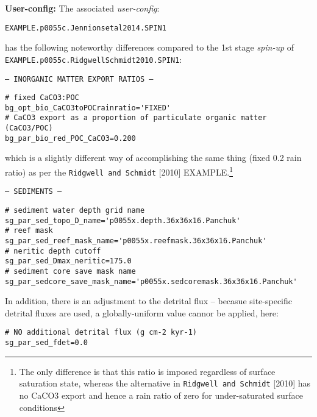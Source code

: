 \documentclass[10pt,twoside]{article}
\begin{document}
\noindent \textbf{User-config:} The associated \textit{user-config}:
\vspace{-10pt}\begin{verbatim}EXAMPLE.p0055c.Jennionsetal2014.SPIN1\end{verbatim}\vspace{-10pt}
has the following noteworthy differences compared to the 1st stage \textit{spin-up} of 
\\\texttt{EXAMPLE.p0055c.RidgwellSchmidt2010.SPIN1}:

\begin{compactitem}
                \item \texttt{--- INORGANIC MATTER EXPORT RATIOS ---}
                \vspace{-5pt}\begin{verbatim}
# fixed CaCO3:POC
bg_opt_bio_CaCO3toPOCrainratio='FIXED'
# CaCO3 export as a proportion of particulate organic matter (CaCO3/POC)
bg_par_bio_red_POC_CaCO3=0.200
                \end{verbatim}\vspace{-5pt}
which is a slightly different way of accomplishing the same thing (fixed 0.2 rain ratio) as per the \texttt{Ridgwell and Schmidt} [2010] EXAMPLE.\footnote{The only difference is that this ratio is imposed regardless of surface saturation state, whereas the alternative in \texttt{Ridgwell and Schmidt} [2010] has no CaCO3 export and hence a rain ratio of zero for under-saturated surface conditions}
                \item \texttt{--- SEDIMENTS ---}
                \vspace{-5pt}\begin{verbatim}
# sediment water depth grid name
sg_par_sed_topo_D_name='p0055x.depth.36x36x16.Panchuk'
# reef mask
sg_par_sed_reef_mask_name='p0055x.reefmask.36x36x16.Panchuk'
# neritic depth cutoff
sg_par_sed_Dmax_neritic=175.0
# sediment core save mask name
sg_par_sedcore_save_mask_name='p0055x.sedcoremask.36x36x16.Panchuk'
                \end{verbatim}\vspace{-5pt}
                In addition, there is an adjustment to the detrital flux -- becasue site-specific detrital fluxes are used, a globally-uniform value cannor be applied, here:
                \vspace{-5pt}\begin{verbatim}
# NO additional detrital flux (g cm-2 kyr-1)
sg_par_sed_fdet=0.0
                \end{verbatim}\vspace{-5pt}

\end{compactitem}
\end{document}
